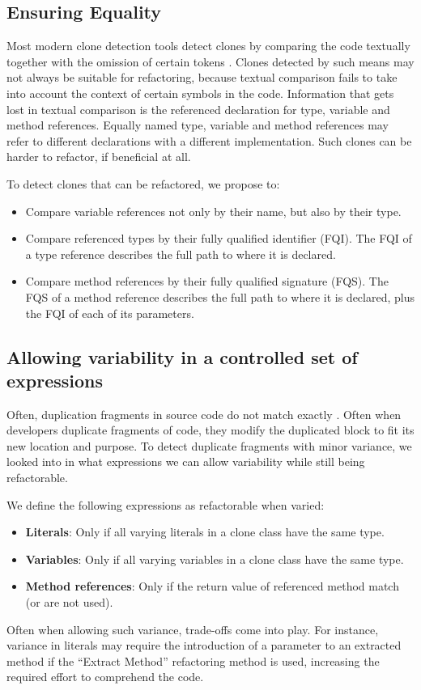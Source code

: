 \documentclass[sigconf,review, table]{acmart}
\begin{document}
\subsection{Ensuring Equality}\label{sec:t1r}
Most modern clone detection tools detect clones by comparing the code textually together with the omission of certain tokens \cite{roy2009comparison, svajlenko2014evaluating}. Clones detected by such means may not always be suitable for refactoring, because textual comparison fails to take into account the context of certain symbols in the code. Information that gets lost in textual comparison is the referenced declaration for type, variable and method references. Equally named type, variable and method references may refer to different declarations with a different implementation. Such clones can be harder to refactor, if beneficial at all.

To detect clones that can be refactored, we propose to:
\begin{itemize}
  \item Compare variable references not only by their name, but also by their type.
  \item Compare referenced types by their fully qualified identifier (FQI). The FQI of a type reference describes the full path to where it is declared.
  \item Compare method references by their fully qualified signature (FQS). The FQS of a method reference describes the full path to where it is declared, plus the FQI of each of its parameters.
\end{itemize}


\subsection{Allowing variability in a controlled set of expressions} \label{sec:t2r}
Often, duplication fragments in source code do not match exactly \cite{kodhai2013method}. Often when developers duplicate fragments of code, they modify the duplicated block to fit its new location and purpose. To detect duplicate fragments with minor variance, we looked into in what expressions we can allow variability while still being refactorable.

We define the following expressions as refactorable when varied:
\begin{itemize}
  \item \textbf{Literals}: Only if all varying literals in a clone class have the same type.
  \item \textbf{Variables}: Only if all varying variables in a clone class have the same type.
  \item \textbf{Method references}: Only if the return value of referenced method match (or are not used).
\end{itemize}
Often when allowing such variance, trade-offs come into play. For instance, variance in literals may require the introduction of a parameter to an extracted method if the ``Extract Method'' refactoring method is used, increasing the required effort to comprehend the code.
\end{document}
